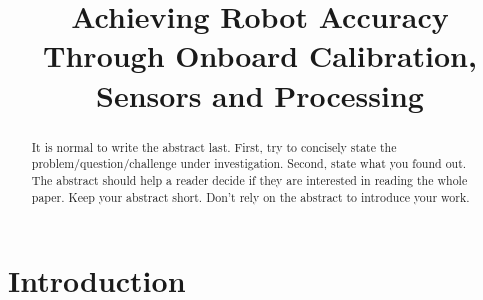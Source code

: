 \documentclass[conference]{IEEEtran}
\begin{document}
\title{Achieving Robot Accuracy Through Onboard Calibration, Sensors and Processing}

\author{
    \and
}

\maketitle

\begin{abstract}
It is normal to write the abstract last.  First, try to concisely state the problem/question/challenge under investigation.  Second, state what you found out.  The abstract should help a reader decide if they are interested in reading the whole paper.  Keep your abstract short.  Don't rely on the abstract to introduce your work.
\end{abstract}


\section{Introduction}\label{sec:intro}

\end{document}
